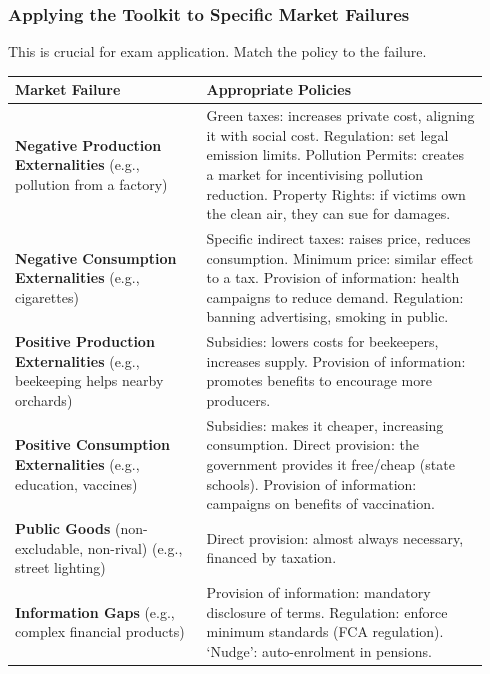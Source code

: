 \documentclass[11pt, a4paper, twoside]{book}
\begin{document}
\subsubsection{Applying the Toolkit to Specific Market Failures}

This is crucial for exam application. Match the policy to the failure.

\begin{example}
\begin{tabular}{@{}>{\RaggedRight\arraybackslash}p{0.38\linewidth}>{\RaggedRight\arraybackslash}p{0.56\linewidth}@{}}
\textbf{Market Failure} & \textbf{Appropriate Policies} \\
\midrule
\textbf{Negative Production Externalities} (e.g., pollution from a factory) &
Green taxes: increases private cost, aligning it with social cost. Regulation: set legal emission limits. Pollution Permits: creates a market for incentivising pollution reduction. Property Rights: if victims own the clean air, they can sue for damages. \\
\textbf{Negative Consumption Externalities} (e.g., cigarettes) &
Specific indirect taxes: raises price, reduces consumption. Minimum price: similar effect to a tax. Provision of information: health campaigns to reduce demand. Regulation: banning advertising, smoking in public. \\
\textbf{Positive Production Externalities} (e.g., beekeeping helps nearby orchards) &
Subsidies: lowers costs for beekeepers, increases supply. Provision of information: promotes benefits to encourage more producers. \\
\textbf{Positive Consumption Externalities} (e.g., education, vaccines) &
Subsidies: makes it cheaper, increasing consumption. Direct provision: the government provides it free/cheap (state schools). Provision of information: campaigns on benefits of vaccination. \\
\textbf{Public Goods} (non-excludable, non-rival) (e.g., street lighting) &
Direct provision: almost always necessary, financed by taxation. \\
\textbf{Information Gaps} (e.g., complex financial products) &
Provision of information: mandatory disclosure of terms. Regulation: enforce minimum standards (FCA regulation). `Nudge': auto-enrolment in pensions. \\
\end{tabular}
\end{example}
\end{document}
